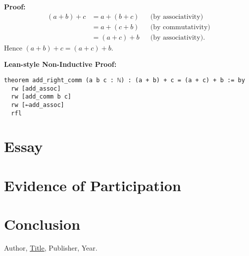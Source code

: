 \documentclass{article}
\theoremstyle{theorem}
\theoremstyle{definition}
\theoremstyle{remark}
\begin{document}
\textbf{Proof:}
\[
\begin{aligned}
(a + b) + c
&= a + (b + c) && \text{(by associativity)} \\
&= a + (c + b) && \text{(by commutativity)} \\
&= (a + c) + b && \text{(by associativity)}.
\end{aligned}
\]
Hence $(a + b) + c = (a + c) + b$.

\textbf{Lean-style Non-Inductive Proof:}
\begin{verbatim}
theorem add_right_comm (a b c : ℕ) : (a + b) + c = (a + c) + b := by
  rw [add_assoc]
  rw [add_comm b c]
  rw [←add_assoc]
  rfl
\end{verbatim}


\section{Essay}

\section{Evidence of Participation}

\section{Conclusion}\label{conclusion}

\begin{thebibliography}{99}
 Author, \href{https://en.wikipedia.org/wiki/LaTeX}{Title}, Publisher, Year.
\end{thebibliography}
\end{document}
